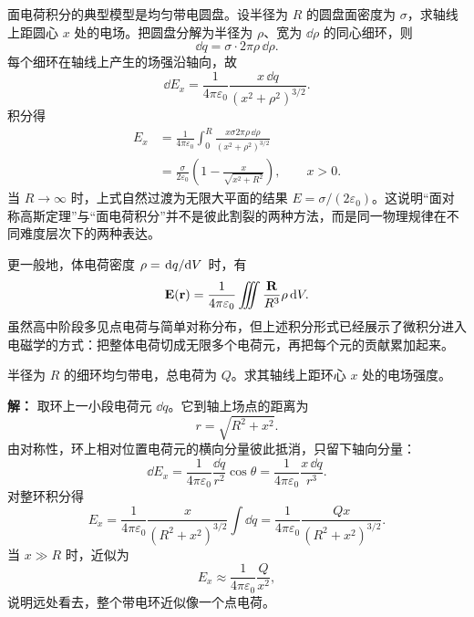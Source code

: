 面电荷积分的典型模型是均匀带电圆盘。设半径为 $R$ 的圆盘面密度为 $\sigma$，求轴线上距圆心 $x$ 处的电场。把圆盘分解为半径为 $\rho$、宽为 $\dd\rho$ 的同心细环，则
\begin{equation}
\dd q = \sigma\cdot 2\pi\rho\,\dd\rho.
\end{equation}
每个细环在轴线上产生的场强沿轴向，故
\begin{equation}
\dd E_x = \frac{1}{4\pi\varepsilon_0}\frac{x\,\dd q}{(x^2+\rho^2)^{3/2}}.
\end{equation}
积分得
\begin{align}
E_x &= \frac{1}{4\pi\varepsilon_0}\int_0^R \frac{x\sigma 2\pi\rho\,\dd\rho}{(x^2+\rho^2)^{3/2}} \\
&= \frac{\sigma}{2\varepsilon_0}\left(1-\frac{x}{\sqrt{x^2+R^2}}\right), \qquad x>0.
\end{align}
当 $R\to\infty$ 时，上式自然过渡为无限大平面的结果 $E=\sigma/(2\varepsilon_0)$。这说明“面对称高斯定理”与“面电荷积分”并不是彼此割裂的两种方法，而是同一物理规律在不同难度层次下的两种表达。

更一般地，体电荷密度 $\rho=\dv*{q}{V}$ 时，有
\begin{equation}
\vb{E}(\vb{r}) = \frac{1}{4\pi\varepsilon_0}\iiint \frac{\vb{R}}{R^3}\rho\,\dd V.
\end{equation}
虽然高中阶段多见点电荷与简单对称分布，但上述积分形式已经展示了微积分进入电磁学的方式：把整体电荷切成无限多个电荷元，再把每个元的贡献累加起来。

\begin{example}[均匀带电细环轴线上一点的电场]
半径为 $R$ 的细环均匀带电，总电荷为 $Q$。求其轴线上距环心 $x$ 处的电场强度。

\textbf{解：} 取环上一小段电荷元 $\dd q$。它到轴上场点的距离为
\begin{equation}
r = \sqrt{R^2+x^2}.
\end{equation}
由对称性，环上相对位置电荷元的横向分量彼此抵消，只留下轴向分量：
\begin{equation}
\dd E_x = \frac{1}{4\pi\varepsilon_0}\frac{\dd q}{r^2}\cos\theta
= \frac{1}{4\pi\varepsilon_0}\frac{x\,\dd q}{r^3}.
\end{equation}
对整环积分得
\begin{equation}
E_x = \frac{1}{4\pi\varepsilon_0}\frac{x}{(R^2+x^2)^{3/2}}\int \dd q
= \frac{1}{4\pi\varepsilon_0}\frac{Qx}{(R^2+x^2)^{3/2}}.
\end{equation}
当 $x\gg R$ 时，近似为
\begin{equation}
E_x \approx \frac{1}{4\pi\varepsilon_0}\frac{Q}{x^2},
\end{equation}
说明远处看去，整个带电环近似像一个点电荷。
\end{example}

